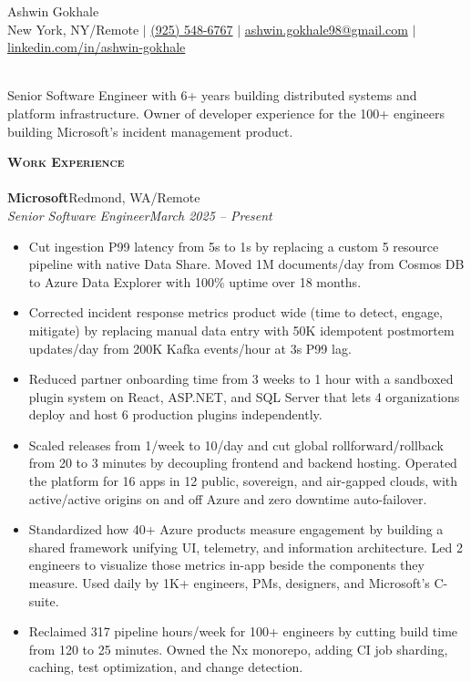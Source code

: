 \documentclass[letterpaper, 10pt]{article}
\newcommand{\lineunder}{
    \vspace*{-8pt} \\
    \hspace*{-18pt} \hrulefill \\
}
\newcommand{\header}[1]{
    \vspace*{10pt}
    {
        \hspace*{-18pt}\vspace*{4pt}
        {\large\textbf{\textsc{#1}}}
    }
    \vspace*{-6pt} \lineunder
}
\newcommand{\contact}[2]{
    \vspace*{-32pt}
    \begin{center}
        {\Huge #1}
        \vspace*{5pt}
        \\
        #2
    \end{center}
    \vspace*{-10pt}
}
\newcommand{\company}[2]{
    \textbf{#1}\hfill #2\\[0pt]
}
\newcommand{\role}[2]{
    \Needspace{5\baselineskip}
    \textit{#1}\hfill \textit{#2}\\[-2pt]
}
\begin{document}
\contact{Ashwin Gokhale}{
    New York, NY/Remote $\vert$
    \href{tel:+19255486767}{(925) 548-6767} $\vert$
    \href{mailto:ashwin.gokhale98@gmail.com}{ashwin.gokhale98@gmail.com} $\vert$
    \href{https://www.linkedin.com/in/ashwin-gokhale/}{linkedin.com/in/ashwin-gokhale}
}

\vspace*{-4pt}
\hspace*{-18pt}\hrulefill\\[3pt]
Senior Software Engineer with 6+ years building distributed systems and platform infrastructure. Owner of developer experience for the 100+ engineers building Microsoft's incident management product.

\header{Work Experience}
\company{Microsoft}{Redmond, WA/Remote}
\role{Senior Software Engineer}{March 2025 -- Present}
\begin{itemize}
    \item Cut ingestion P99 latency from 5s to 1s by replacing a custom 5 resource pipeline with native Data Share. Moved 1M documents/day from Cosmos DB to Azure Data Explorer with 100\% uptime over 18 months.
    \item Corrected incident response metrics product wide (time to detect, engage, mitigate) by replacing manual data entry with 50K idempotent postmortem updates/day from 200K Kafka events/hour at 3s P99 lag.
    \item Reduced partner onboarding time from 3 weeks to 1 hour with a sandboxed plugin system on React, ASP.NET, and SQL Server that lets 4 organizations deploy and host 6 production plugins independently.
    \item Scaled releases from 1/week to 10/day and cut global rollforward/rollback from 20 to 3 minutes by decoupling frontend and backend hosting. Operated the platform for 16 apps in 12 public, sovereign, and air-gapped clouds, with active/active origins on and off Azure and zero downtime auto-failover.
    \item Standardized how 40+ Azure products measure engagement by building a shared framework unifying UI, telemetry, and information architecture. Led 2 engineers to visualize those metrics in-app beside the components they measure. Used daily by 1K+ engineers, PMs, designers, and Microsoft's C-suite.
    \item Reclaimed 317 pipeline hours/week for 100+ engineers by cutting build time from 120 to 25 minutes. Owned the Nx monorepo, adding CI job sharding, caching, test optimization, and change detection.
\end{itemize}
\end{document}
